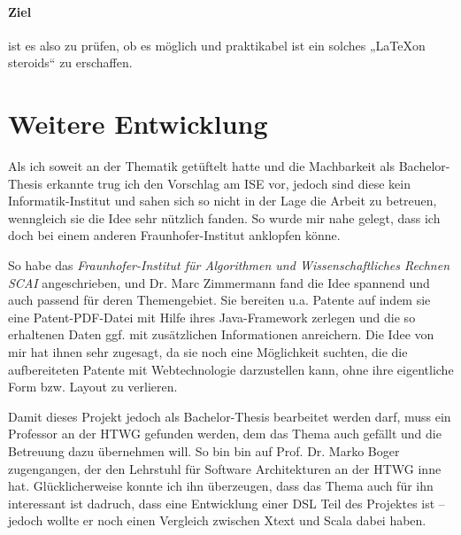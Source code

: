 \paragraph{Ziel} ist es also zu prüfen, ob es möglich und praktikabel ist
ein solches „\LaTeX on steroids“ zu erschaffen.

\section{Weitere Entwicklung}

Als ich soweit an der Thematik getüftelt hatte und die Machbarkeit als
Bachelor-Thesis erkannte trug ich den Vorschlag am ISE vor, jedoch sind
diese kein Informatik-Institut und sahen sich so nicht in der Lage die Arbeit
zu betreuen, wenngleich sie die Idee sehr nützlich fanden. So wurde mir
nahe gelegt, dass ich doch bei einem anderen Fraunhofer-Institut anklopfen
könne.

So habe das \emph{Fraunhofer-Institut für Algorithmen und Wissenschaftliches
Rechnen SCAI} angeschrieben, und Dr. Marc Zimmermann fand
die Idee spannend und auch passend für deren Themengebiet. Sie bereiten u.a.
Patente auf indem sie eine Patent-PDF-Datei mit Hilfe ihres Java-Framework
zerlegen und die so erhaltenen Daten ggf. mit zusätzlichen Informationen
anreichern. Die Idee von mir hat ihnen sehr zugesagt, da sie noch eine
Möglichkeit suchten, die die aufbereiteten Patente mit Webtechnologie
darzustellen kann, ohne ihre eigentliche Form bzw. Layout zu verlieren.

Damit dieses Projekt jedoch als Bachelor-Thesis bearbeitet werden darf,
muss ein Professor an der HTWG gefunden werden, dem das Thema auch gefällt
und die Betreuung dazu übernehmen will. So bin bin auf Prof. Dr. Marko
Boger zugengangen, der den Lehrstuhl für Software Architekturen an der HTWG
inne hat. Glücklicherweise konnte ich ihn überzeugen, dass das Thema auch
für ihn interessant ist dadruch, dass eine Entwicklung einer DSL Teil des
Projektes ist -- jedoch wollte er noch einen Vergleich zwischen Xtext und Scala
dabei haben.
